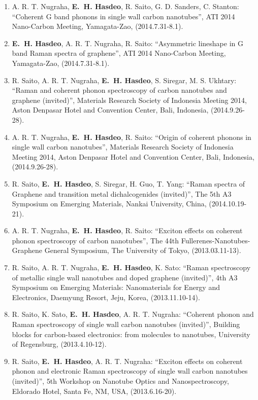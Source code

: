 \documentclass[a4paper,11pt]{article}
\newcommand{\jjm}[5]{\item {#1}: {``#2''}, {#3}, {#5}, (#4).}
\newcommand{\rs}{R. Saito}
\def\hes{{\bf E.~H. Hasdeo}}
\begin{document}
\begin{enumerate}
\jjm{A. R. T. Nugraha, \hes, \rs, G. D. Sanders, C. Stanton}
{Coherent G band phonons in single wall carbon nanotubes}
{ATI 2014 Nano-Carbon Meeting}
{2014.7.31-8.1}{Yamagata-Zao}

\jjm{ \hes, A. R. T. Nugraha, \rs}
{Asymmetric lineshape in G band Raman spectra of graphene}
{ATI 2014 Nano-Carbon Meeting}
{2014.7.31-8.1}{Yamagata-Zao}
\jjm{\rs, A. R. T. Nugraha, \hes, S. Siregar, M. S. Ukhtary}
{Raman and coherent phonon spectroscopy of carbon nanotubes and graphene (invited)}
{Materials Research Society of Indonesia Meeting 2014}
{2014.9.26-28}{Aston Denpasar Hotel and Convention Center, Bali, Indonesia}

\jjm{A. R. T. Nugraha, \hes, \rs}
{Origin of coherent phonons in single wall carbon nanotubes}
{Materials Research Society of Indonesia Meeting 2014}
{2014.9.26-28}{Aston Denpasar Hotel and Convention Center, Bali, Indonesia}
\jjm{\rs, \hes, S. Siregar, H. Guo, T. Yang} 
{Raman spectra of Graphene and transition metal dichalcogenides (invited)}
{The 5th A3 Symposium on Emerging Materials}
{2014.10.19-21}{Nankai University, China}
\jjm{A. R. T. Nugraha, \hes, \rs}
{Exciton effects on coherent phonon spectroscopy of carbon nanotubes}
{The 44th Fullerenes-Nanotubes-Graphene General Symposium}
{2013.03.11-13}{The University of Tokyo}
\jjm{\rs, A. R. T. Nugraha, \hes, K. Sato}
{Raman spectroscopy of metallic single wall nanotubes and doped graphene (invited)}
{4th A3 Symposium on Emerging Materials: Nanomaterials for Energy and
Electronics}
{2013.11.10-14}{Daemyung Resort, Jeju, Korea}
%
\jjm{\rs, K. Sato, \hes, A. R. T. Nugraha}
{Coherent phonon and Raman spectroscopy of single wall carbon nanotubes (invited)}
{Building blocks for carbon-based electronics: from molecules to nanotubes}
{2013.4.10-12}{University of Regensburg}
%
\jjm{\rs, \hes, A. R. T. Nugraha}
{Exciton effects on coherent phonon and electronic Raman spectroscopy of 
single wall carbon nanotubes (invited)}
{5th Workshop on Nanotube Optics and Nanospectroscopy}
{2013.6.16-20}{Eldorado Hotel, Santa Fe, NM, USA}

\end{enumerate}
\end{document}
